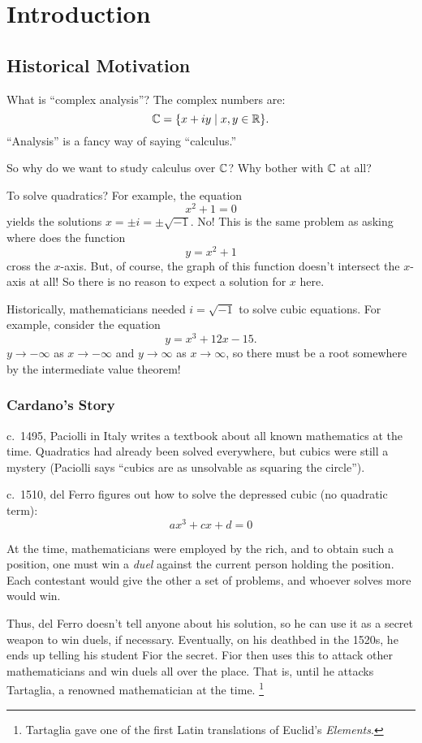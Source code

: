 \chapter{Introduction}
\section{Historical Motivation}
What is ``complex analysis''? The complex numbers are:
\[
  \mathbb{C} = \{x + iy \mid x, y \in \mathbb{R}\}
.\] 
``Analysis'' is a fancy way of saying ``calculus.''

So why do we want to study calculus over $\mathbb{C}$?
Why bother with $\mathbb{C}$ at all?

To solve quadratics? For example, the equation
\[x^2 + 1 = 0\]
yields the solutions $x = \pm i = \pm \sqrt{-1}$. No!
This is the same problem as asking where does the
function
\[y = x^2 + 1\]
cross the $x$-axis. But, of course, the graph of this
function doesn't intersect the $x$-axis at all! So there
is no reason to expect a solution for $x$ here.

Historically, mathematicians needed $i = \sqrt{-1}$
to solve cubic equations.
For example, consider the equation
\[y = x^3 + 12x - 15.\]
$y \to -\infty$ as $x \to -\infty$ and $y \to \infty$
as $x \to \infty$, so there must be a root somewhere by
the intermediate value theorem!

\subsection{Cardano's Story}
c.~1495, Paciolli in Italy writes a textbook about all
known mathematics at the time. Quadratics had already
been solved everywhere, but cubics were still a mystery
(Paciolli says ``cubics are as unsolvable as squaring
the circle'').

c.~1510, del Ferro figures out how to
solve the depressed cubic (no quadratic term):
\[ax^3 + cx + d = 0\]

At the time, mathematicians were employed by the rich,
and to obtain such a position, one must win a
\textit{duel} against the current person holding the
position. Each contestant would give the other a set
of problems, and whoever solves more would win.

Thus, del Ferro doesn't tell anyone about his solution,
so he can use it as a secret weapon to win duels, if
necessary. Eventually, on his deathbed in the
1520s, he ends up telling his student Fior the secret.
Fior then
uses this to attack other mathematicians and win duels
all over the place. That is, until he attacks Tartaglia,
a renowned mathematician at the time.
\footnote{Tartaglia gave one of the first Latin
translations of Euclid's \textit{Elements}.}


